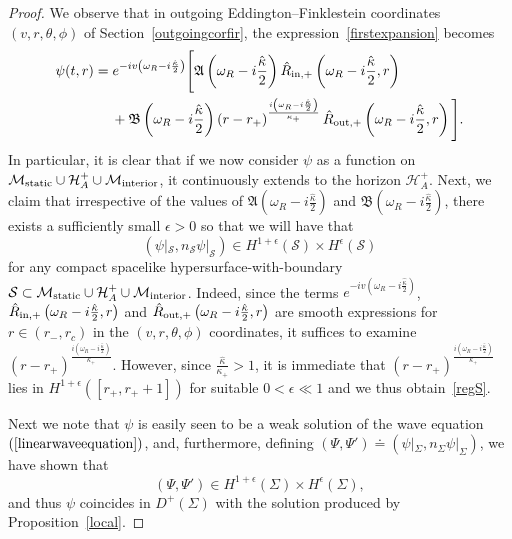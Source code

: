 \documentclass[A4,10pt]{article}
\begin{document}
\begin{proof}
We observe that in outgoing Eddington--Finklestein coordinates $\left(v,r,\theta,\phi\right)$
of Section~\ref{outgoingcorfir}, the expression~\eqref{firstexpansion} becomes
\begin{align}\label{secondexpansion}
&\psi(t,r) = e^{-iv\left(\omega_R - i\frac{\hat{\kappa}}{2}\right)}\Bigg[ \mathfrak A\left(\omega_R-i\frac{\hat{\kappa}}{2}\right)\hat{R}_{{\rm in},+}\left(\omega_R-i\frac{\hat{\kappa}}{2},r\right) 
\\ \nonumber &\qquad \qquad +\mathfrak B\left(\omega_R-i\frac{\hat{\kappa}}{2}\right)\left(r-r_+\right)^{\frac{i\left(\omega_R-i\frac{\hat{\kappa}}{2}\right)}{\kappa_+}}\hat{R}_{{\rm out},+}\left(\omega_R-i\frac{\hat{\kappa}}{2},r\right)\Bigg].
\end{align}
In particular, it is clear that if we now consider $\psi$ as a function on $\mathcal{M}_{{\rm static}}\cup\mathcal{H}^+_A \cup\mathcal{M}_{{\rm interior}}$, it continuously extends to the horizon $\mathcal{H}^+_A$. Next, we claim that irrespective of the values of $\mathfrak A\left(\omega_R-i\frac{\hat{\kappa}}{2}\right)$ and $\mathfrak B\left(\omega_R-i\frac{\hat{\kappa}}{2}\right)$, there exists a sufficiently small $\epsilon > 0$ so that we will have that 
\begin{equation}\label{regS}
\left(\psi|_{\mathcal{S}},n_{\mathcal{S}}\psi|_{\mathcal{S}}\right)\in H^{1+\epsilon}\left(\mathcal{S}\right) \times H^{\epsilon}\left(\mathcal{S}\right)
\end{equation}
for any compact spacelike hypersurface-with-boundary $\mathcal{S} \subset \mathcal{M}_{{\rm static}}\cup\mathcal{H}^+_A\cup\mathcal{M}_{{\rm interior}}$. Indeed, since the terms $e^{-iv\left(\omega_R - i\frac{\hat{\kappa}}{2}\right)}$, $\hat{R}_{{\rm in},+}\left(\omega_R-i\frac{\hat{\kappa}}{2},r\right)$ and $\hat{R}_{{\rm out},+}\left(\omega_R-i\frac{\hat{\kappa}}{2},r\right)$  are smooth expressions for $r \in (r_-,r_c)$ in the $(v,r,\theta,\phi)$ coordinates, it suffices to examine $\left(r-r_+\right)^{\frac{i\left(\omega_R-i\frac{\hat{\kappa}}{2}\right)}{\kappa_+}}$. However, since $\frac{\hat{\kappa}}{\kappa_+} > 1$, it is immediate that $\left(r-r_+\right)^{\frac{i\left(\omega_R-i\frac{\hat{\kappa}}{2}\right)}{\kappa_+}}$ lies in $H^{1+\epsilon}\left([r_+,r_++1]\right)$ for suitable $0 < \epsilon \ll 1$ and we thus obtain~\eqref{regS}.


Next we note that $\psi$ is easily seen to be a weak solution of the wave equation
$(\ref{linearwaveequation})$, and, 
furthermore, defining $(\Psi,\Psi')\doteq (\psi|_{\Sigma},n_{\Sigma}\psi|_{\Sigma})$, we have shown that
\[(\Psi,\Psi') \in H^{1+\epsilon}(\Sigma) \times H^{\epsilon}(\Sigma),\]
and thus $\psi$ coincides in $D^+(\Sigma)$
with the solution produced by Proposition~\ref{local}.


\end{proof}
\end{document}
